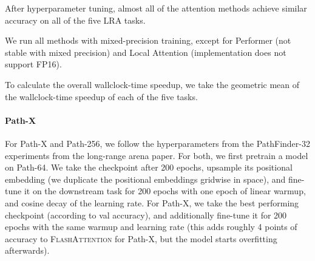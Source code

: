 \documentclass{article}
\newcommand{\sysname}{\textsc{FlashAttention}\xspace}
\begin{document}
After hyperparameter tuning, almost all of the attention methods achieve similar
accuracy on all of the five LRA tasks.

We run all methods with mixed-precision training, except for Performer (not
stable with mixed precision) and Local Attention (implementation does not
support FP16).

To calculate the overall wallclock-time speedup, we take the geometric mean of
the wallclock-time speedup of each of the five tasks.

\paragraph{Path-X}
For Path-X and Path-256, we follow the hyperparameters from the PathFinder-32 experiments from the long-range arena paper\citep{tay2020long}.
For both, we first pretrain a model on Path-64.
We take the checkpoint after 200 epochs, upsample its positional embedding (we duplicate the positional embeddings gridwise in space), and fine-tune it on the downstream task for 200 epochs with one epoch of linear warmup, and cosine decay of the learning rate.
For Path-X, we take the best performing checkpoint (according to val accuracy), and additionally fine-tune it for 200 epochs with the same warmup and learning rate (this adds roughly 4 points of accuracy to \sysname for Path-X, but the model starts overfitting afterwards).
\end{document}

